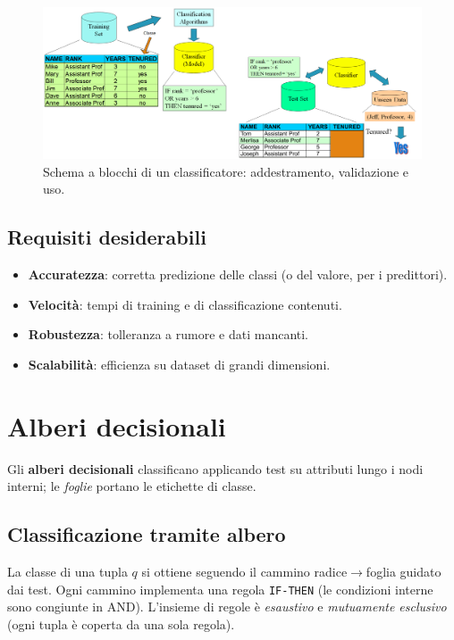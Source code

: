\begin{figure}[htbp]
  \centering
  \includegraphics[width=.72\textwidth]{images/schema_classificatore.png}
  \caption{Schema a blocchi di un classificatore: addestramento, validazione e uso.}
  \label{fig:schema-class}
\end{figure}

\subsection{Requisiti desiderabili}\label{subsec:req}
\begin{itemize}
  \item \textbf{Accuratezza}: corretta predizione delle classi (o del valore, per i predittori).
  \item \textbf{Velocità}: tempi di training e di classificazione contenuti.
  \item \textbf{Robustezza}: tolleranza a rumore e dati mancanti.
  \item \textbf{Scalabilità}: efficienza su dataset di grandi dimensioni.
\end{itemize}

\section{Alberi decisionali}\label{sec:trees}
Gli \textbf{alberi decisionali} classificano applicando test su attributi lungo i nodi interni;
le \emph{foglie} portano le etichette di classe.

\subsection{Classificazione tramite albero}\label{subsec:tree-class}
La classe di una tupla $q$ si ottiene seguendo il cammino radice$\to$foglia guidato
dai test. Ogni cammino implementa una regola \texttt{IF-THEN} (le condizioni interne sono congiunte in AND). L’insieme di regole è \emph{esaustivo} e \emph{mutuamente esclusivo} (ogni tupla è coperta da una sola regola).

